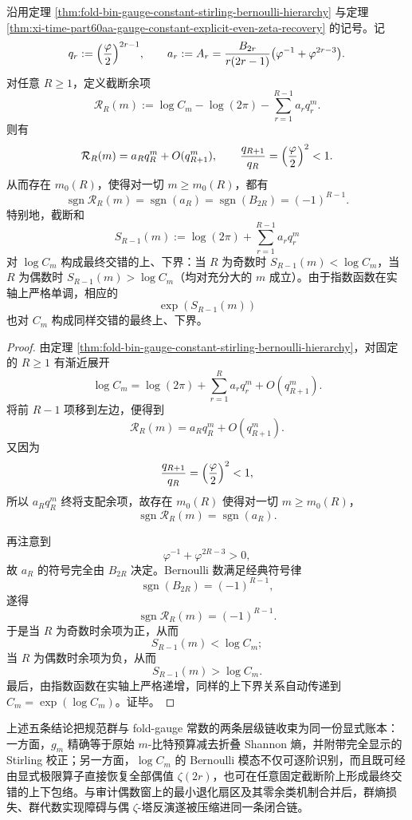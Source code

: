 \begin{theorem}\label{thm:xi-time-part60aa-stirling-bernoulli-tail-alternation}
沿用定理 \ref{thm:fold-bin-gauge-constant-stirling-bernoulli-hierarchy} 与定理 \ref{thm:xi-time-part60aa-gauge-constant-explicit-even-zeta-recovery} 的记号。记
\[
q_r:=\Bigl(\frac{\varphi}{2}\Bigr)^{2r-1},
\qquad
a_r:=A_r=
\frac{B_{2r}}{r(2r-1)}\bigl(\varphi^{-1}+\varphi^{2r-3}\bigr).
\]
对任意 \(R\ge 1\)，定义截断余项
\[
\mathcal R_R(m):=
\log C_m-\log(2\pi)-\sum_{r=1}^{R-1}a_r q_r^m.
\]
则有
\[
\mathcal R_R(m)=a_R q_R^m+O(q_{R+1}^m),
\qquad
\frac{q_{R+1}}{q_R}=\Bigl(\frac{\varphi}{2}\Bigr)^2<1.
\]
从而存在 \(m_0(R)\)，使得对一切 \(m\ge m_0(R)\)，都有
\[
\operatorname{sgn}\mathcal R_R(m)=\operatorname{sgn}(a_R)=\operatorname{sgn}(B_{2R})=(-1)^{R-1}.
\]
特别地，截断和
\[
S_{R-1}(m):=\log(2\pi)+\sum_{r=1}^{R-1}a_r q_r^m
\]
对 \(\log C_m\) 构成最终交错的上、下界：当 \(R\) 为奇数时 \(S_{R-1}(m)<\log C_m\)，当 \(R\) 为偶数时 \(S_{R-1}(m)>\log C_m\)（均对充分大的 \(m\) 成立）。由于指数函数在实轴上严格单调，相应的
\[
\exp(S_{R-1}(m))
\]
也对 \(C_m\) 构成同样交错的最终上、下界。
\end{theorem}
\begin{proof}
由定理 \ref{thm:fold-bin-gauge-constant-stirling-bernoulli-hierarchy}，对固定的 \(R\ge 1\) 有渐近展开
\[
\log C_m
=
\log(2\pi)+\sum_{r=1}^{R}a_r q_r^m+O(q_{R+1}^m).
\]
将前 \(R-1\) 项移到左边，便得到
\[
\mathcal R_R(m)=a_R q_R^m+O(q_{R+1}^m).
\]
又因为
\[
\frac{q_{R+1}}{q_R}=\Bigl(\frac{\varphi}{2}\Bigr)^2<1,
\]
所以 \(a_R q_R^m\) 终将支配余项，故存在 \(m_0(R)\) 使得对一切 \(m\ge m_0(R)\)，
\[
\operatorname{sgn}\mathcal R_R(m)=\operatorname{sgn}(a_R).
\]

再注意到
\[
\varphi^{-1}+\varphi^{2R-3}>0,
\]
故 \(a_R\) 的符号完全由 \(B_{2R}\) 决定。Bernoulli 数满足经典符号律
\[
\operatorname{sgn}(B_{2R})=(-1)^{R-1},
\]
遂得
\[
\operatorname{sgn}\mathcal R_R(m)=(-1)^{R-1}.
\]
于是当 \(R\) 为奇数时余项为正，从而
\[
S_{R-1}(m)<\log C_m;
\]
当 \(R\) 为偶数时余项为负，从而
\[
S_{R-1}(m)>\log C_m.
\]
最后，由指数函数在实轴上严格递增，同样的上下界关系自动传递到 \(C_m=\exp(\log C_m)\)。证毕。
\end{proof}

\noindent
上述五条结论把规范群与 fold-gauge 常数的两条层级链收束为同一份显式账本：一方面，\(g_m\) 精确等于原始 \(m\)-比特预算减去折叠 Shannon 熵，并附带完全显示的 Stirling 校正；另一方面，\(\log C_m\) 的 Bernoulli 模态不仅可逐阶识别，而且既可经由显式极限算子直接恢复全部偶值 \(\zeta(2r)\)，也可在任意固定截断阶上形成最终交错的上下包络。与审计偶数窗上的最小退化扇区及其零余类机制合并后，群熵损失、群代数实现障碍与偶 \(\zeta\)-塔反演遂被压缩进同一条闭合链。

\endinput
